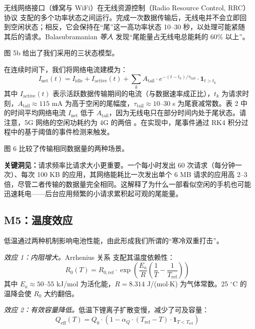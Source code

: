 \documentclass[11pt,a4paper]{ctexart}
\begin{document}
无线网络接口（蜂窝与 WiFi）在无线资源控制（Radio Resource Control, RRC）协议 \cite{ref15} 支配的多个功率状态之间运行。完成一次数据传输后，无线电并不会立即回到空闲状态；相反，它会保持在“尾”这一高功率状态 10--30 秒，以处理可能紧随其后的请求。Balasubramanian \textit{等人} \cite{ref3} 发现“尾能量占无线电总能耗的 60\% 以上”。

图 5b 给出了我们采用的三状态模型。

在连续时间下，我们将网络电流建模为：
\begin{equation}
I_{\mathrm{net}}(t) = I_{\mathrm{idle}} + I_{\mathrm{active}}(t) + \sum_{k} A_{\mathrm{tail}}\cdot e^{-(t-t_k)/\tau_{\mathrm{tail}}}\cdot \mathbf{1}_{t>t_k}
\end{equation}
其中 $I_{\mathrm{active}}(t)$ 表示活跃数据传输期间的电流（与数据速率成正比），$t_k$ 为请求时刻，$A_{\mathrm{tail}} \approx 115$ mA 为高于空闲的尾幅度，$\tau_{\mathrm{tail}} \approx 10$--$30$ s 为尾衰减常数。表 2 中的时间平均网络电流 $I_{\mathrm{net}}$ 低于 $A_{\mathrm{tail}}$，因为无线电只在部分时间内处于尾状态。请注意，5G 网络的空闲功耗约为 4G 的两倍 \cite{ref2}。在实现中，尾事件通过 RK4 积分过程中的基于阈值的事件检测来触发。

图 6 比较了传输相同数据量的两种场景。

\textbf{关键洞见：}请求频率比请求大小更重要。一个每小时发出 60 次请求（每分钟一次）、每次 100 KB 的应用，其网络能耗比一次发出单个 6 MB 请求的应用高 2--3 倍，尽管二者传输的数据量完全相同。这解释了为什么一部看似空闲的手机也可能迅速耗电——后台应用频繁的小请求累积起可观的尾能量。

\subsection{M5：温度效应}

低温通过两种机制影响电池性能，由此形成我们所谓的“寒冷双重打击”。

\textit{效应 1：内阻增大。}Arrhenius 关系 \cite{ref16,ref17} 支配其温度依赖性：
\begin{equation}
R_0(T) = R_{0,\mathrm{ref}}\cdot\exp\left(\frac{E_a}{R}\left(\frac{1}{T}-\frac{1}{T_{\mathrm{ref}}}\right)\right)
\end{equation}
其中 $E_a \approx 50$--$55$ kJ/mol 为活化能，$R = 8.314$ J/(mol$\cdot$K) 为气体常数。25 $^{\circ}$C 的温降会使 $R_0$ 大约翻倍。

\textit{效应 2：有效容量降低。}低温下锂离子扩散变慢，减少了可及容量：
\begin{equation}
Q_{\mathrm{eff}}(T) = Q_0\cdot\left(1-\alpha_Q\cdot(T_{\mathrm{ref}}-T)\cdot\mathbf{1}_{T<T_{\mathrm{ref}}}\right)
\end{equation}
\end{document}
